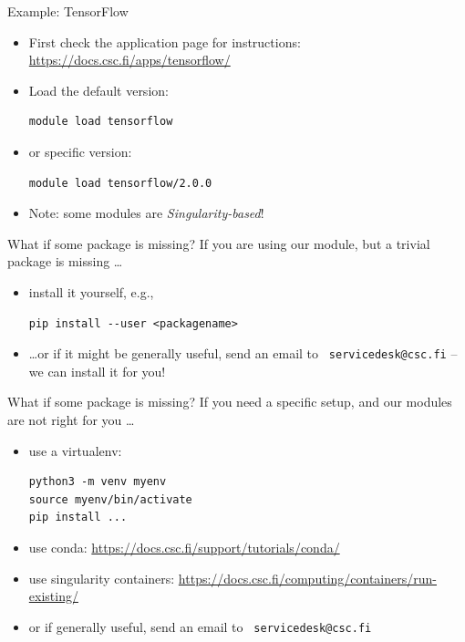 \documentclass[aspectratio=1610,14pt]{beamer}
\newcommand{\link}[1]{\alert{\url{#1}}}
\newcommand{\vitem}{\vfill\item}
\begin{document}
\begin{frame}[fragile]{Example: TensorFlow}
  \begin{itemize}
  \vitem First check the application page for instructions:
    \link{https://docs.csc.fi/apps/tensorflow/}
  \vitem Load the default version:
\begin{verbatim}
module load tensorflow
\end{verbatim}
  \vitem or specific version:
\begin{verbatim}
module load tensorflow/2.0.0
\end{verbatim}
  \vitem \alert{Note:} some modules are \emph{Singularity-based}!
\end{itemize}
\vfill
\end{frame}

\begin{frame}[fragile]{What if some package is missing?}
  If you are using our module, but a trivial package is missing \ldots
  \begin{itemize}
  \vitem install it yourself, e.g.,
\begin{verbatim}
pip install --user <packagename>
\end{verbatim}
  \vitem \ldots or if it might be generally useful, send an email to \alert{\tt
      servicedesk@csc.fi} -- we can install it for you!
  \end{itemize}
  \vfill
  
\end{frame}

\begin{frame}[fragile]{What if some package is missing?}
  If you need a specific setup, and our modules are not right for you \ldots
  \begin{itemize}
  \vitem use a virtualenv:
\begin{verbatim}
python3 -m venv myenv
source myenv/bin/activate
pip install ...
\end{verbatim}
    
  \vitem use conda: {\small \link{https://docs.csc.fi/support/tutorials/conda/}}
  \vitem use singularity containers: {\small \link{https://docs.csc.fi/computing/containers/run-existing/}}
    
  \vitem or if generally useful, send an email to \alert{\tt
      servicedesk@csc.fi}
  \end{itemize}
  
\end{frame}
\end{document}
